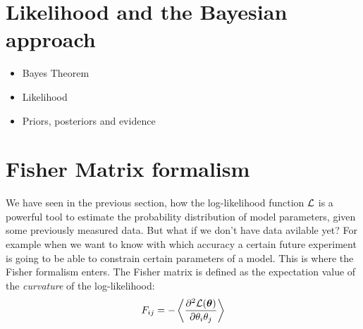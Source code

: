 \clearpage

\section{Likelihood and the Bayesian approach}
\begin{itemize}
\item Bayes Theorem 
\item Likelihood
\item Priors, posteriors and evidence
\end{itemize}






\section{Fisher Matrix formalism}
We have seen in the previous section, how the log-likelihood function $\mathcal{L}$ is a powerful
tool to estimate the probability distribution of model parameters, given some previously measured data.
But what if we don't have data avilable yet? For example when we want to know 
with which accuracy a certain future experiment is going to be able to constrain certain parameters of
a model. 
This is where the Fisher formalism \cite{(cite Fisher, Tegmark, etc.)} enters.
The Fisher matrix is defined as the expectation value of the \emph{curvature} of the log-likelihood:
\begin{equation}
F_{ij} = -\left< \frac{\partial^2 \mathcal{L}(\bm{\theta})}{\partial \theta_i \theta_j} \right>
\end{equation}


